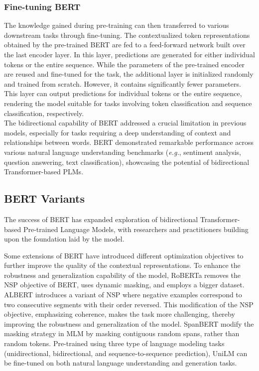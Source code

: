 \subsubsection{Fine-tuning BERT}

The knowledge gained during pre-training can then transferred to various downstream tasks through fine-tuning. The contextualized token representations obtained by the pre-trained \ac{BERT} are fed to a feed-forward network built over the last encoder layer. In this layer, predictions are generated for either individual tokens or the entire sequence. While the parameters of the pre-trained encoder are reused and fine-tuned for the task, the additional layer is initialized randomly and trained from scratch. However, it contains significantly fewer parameters. This layer can output predictions for individual tokens or the entire sequence, rendering the model suitable for tasks involving token classification and sequence classification, respectively. \\

The bidirectional capability of \ac{BERT} addressed a crucial limitation in previous models, especially for tasks requiring a deep understanding of context and relationships between words. \ac{BERT} demonstrated remarkable performance across various natural language understanding benchmarks (\textit{e.g.}, sentiment analysis, question answering, text classification), showcasing the potential of bidirectional Transformer-based PLMs.
 
\subsection{BERT Variants}

The success of \ac{BERT} has expanded exploration of bidirectional Transformer-based Pre-trained Language Models, with researchers and practitioners building upon the foundation laid by the model. 

Some extensions of \ac{BERT} have introduced different optimization objectives to further improve the quality of the contextual representations. To enhance the robustness and generalization capability of the model, \ac{RoBERTa} \citep{liu2019roberta} removes the \ac{NSP} objective of \ac{BERT}, uses dynamic masking, and employs a bigger dataset. \ac{ALBERT} \citep{lan2019albert} introduces a variant of \ac{NSP} where negative examples correspond to two consecutive segments with their order reversed. This modification of the \ac{NSP} objective, emphasizing coherence, makes the task more challenging, thereby improving the robustness and generalization of the model. SpanBERT \citep{joshi2020spanbert} modify the masking strategy in \ac{MLM} by masking contiguous random spans, rather than random tokens. Pre-trained using three type of language modeling tasks (unidirectional, bidirectional, and sequence-to-sequence prediction), UniLM \citep{dong2019unified} can be fine-tuned on both natural language understanding and generation tasks. 


